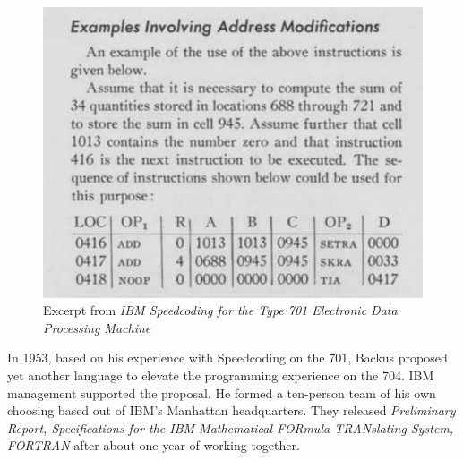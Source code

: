%

\begin{figure}[h!]
  \centering
  \includegraphics[width=0.5\linewidth]{resource/ibm-speedcoding-example.png}
  \caption{Excerpt from \textit{IBM Speedcoding for the Type 701 Electronic Data Processing Machine} 
  \cite{IBM_1954_Speedcoding}}
  \label{fig:ibm-speedcoding-example}
\end{figure}

In 1953, based on his experience with Speedcoding on the 701, Backus proposed yet another language to elevate the programming experience on the 704.
IBM management supported the proposal.
He formed a ten-person team of his own choosing based out of IBM's Manhattan headquarters.
They released \textit{Preliminary Report, Specifications for the IBM Mathematical FORmula TRANslating System, FORTRAN}
after about one year of working together.


